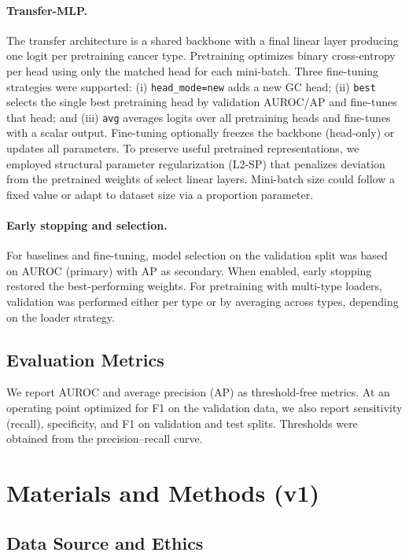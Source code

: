 \documentclass[journal,article,submit,pdftex,moreauthors]{Definitions/mdpi}
\begin{document}
\paragraph{Transfer-MLP.} The transfer architecture is a shared backbone with a final linear layer producing one logit per pretraining cancer type. Pretraining optimizes binary cross-entropy per head using only the matched head for each mini-batch. Three fine-tuning strategies were supported: (i) \texttt{head\_mode=new} adds a new GC head; (ii) \texttt{best} selects the single best pretraining head by validation AUROC/AP and fine-tunes that head; and (iii) \texttt{avg} averages logits over all pretraining heads and fine-tunes with a scalar output. Fine-tuning optionally freezes the backbone (head-only) or updates all parameters. To preserve useful pretrained representations, we employed structural parameter regularization (L2-SP) that penalizes deviation from the pretrained weights of select linear layers. Mini-batch size could follow a fixed value or adapt to dataset size via a proportion parameter.


\paragraph{Early stopping and selection.} For baselines and fine-tuning, model selection on the validation split was based on AUROC (primary) with AP as secondary. When enabled, early stopping restored the best-performing weights. For pretraining with multi-type loaders, validation was performed either per type or by averaging across types, depending on the loader strategy.


\subsection{Evaluation Metrics}
We report AUROC and average precision (AP) as threshold-free metrics. At an operating point optimized for F1 on the validation data, we also report sensitivity (recall), specificity, and F1 on validation and test splits. Thresholds were obtained from the precision--recall curve.



\section{Materials and Methods (v1)}

\subsection{Data Source and Ethics}
\end{document}
